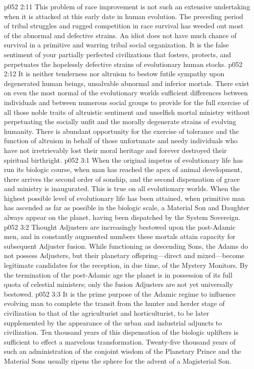 \vs p052 2:11 This problem of race improvement is not such an extensive undertaking when it is attacked at this early date in human evolution. The preceding period of tribal struggles and rugged competition in race survival has weeded out most of the abnormal and defective strains. An idiot does not have much chance of survival in a primitive and warring tribal social organization. It is the false sentiment of your partially perfected civilizations that fosters, protects, and perpetuates the hopelessly defective strains of evolutionary human stocks.
\vs p052 2:12 It is neither tenderness nor altruism to bestow futile sympathy upon degenerated human beings, unsalvable abnormal and inferior mortals. There exist on even the most normal of the evolutionary worlds sufficient differences between individuals and between numerous social groups to provide for the full exercise of all those noble traits of altruistic sentiment and unselfish mortal ministry without perpetuating the socially unfit and the morally degenerate strains of evolving humanity. There is abundant opportunity for the exercise of tolerance and the function of altruism in behalf of those unfortunate and needy individuals who have not irretrievably lost their moral heritage and forever destroyed their spiritual birthright.
\vs p052 3:1 When the original impetus of evolutionary life has run its biologic course, when man has reached the apex of animal development, there arrives the second order of sonship, and the second dispensation of grace and ministry is inaugurated. This is true on all evolutionary worlds. When the highest possible level of evolutionary life has been attained, when primitive man has ascended as far as possible in the biologic scale, a Material Son and Daughter always appear on the planet, having been dispatched by the System Sovereign.
\vs p052 3:2 Thought Adjusters are increasingly bestowed upon the post\hyp{}Adamic men, and in constantly augmented numbers these mortals attain capacity for subsequent Adjuster fusion. While functioning as descending Sons, the Adams do not possess Adjusters, but their planetary offspring---direct and mixed---become legitimate candidates for the reception, in due time, of the Mystery Monitors. By the termination of the post\hyp{}Adamic age the planet is in possession of its full quota of celestial ministers; only the fusion Adjusters are not yet universally bestowed.
\pc \vs p052 3:3 It is the prime purpose of the Adamic regime to influence evolving man to complete the transit from the hunter and herder stage of civilization to that of the agriculturist and horticulturist, to be later supplemented by the appearance of the urban and industrial adjuncts to civilization. Ten thousand years of this dispensation of the biologic uplifters is sufficient to effect a marvelous transformation. Twenty\hyp{}five thousand years of such an administration of the conjoint wisdom of the Planetary Prince and the Material Sons usually ripens the sphere for the advent of a Magisterial Son.
